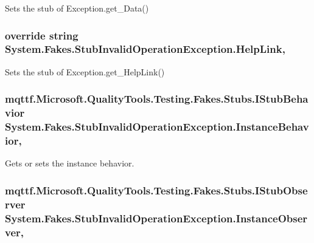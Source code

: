 Sets the stub of Exception.\-get\-\_\-\-Data()

\hypertarget{class_system_1_1_fakes_1_1_stub_invalid_operation_exception_a174fc9ff9bfcf7419921f3185662b211}{
\subsubsection[{Help\-Link}]{\setlength{\rightskip}{0pt plus 5cm}override string System.\-Fakes.\-Stub\-Invalid\-Operation\-Exception.\-Help\-Link\hspace{0.3cm}{\ttfamily [get]}, {\ttfamily [set]}}}\label{class_system_1_1_fakes_1_1_stub_invalid_operation_exception_a174fc9ff9bfcf7419921f3185662b211}


Sets the stub of Exception.\-get\-\_\-\-Help\-Link()

\hypertarget{class_system_1_1_fakes_1_1_stub_invalid_operation_exception_a99a678632f674e88b67d13edc509c18a}{
\subsubsection[{Instance\-Behavior}]{\setlength{\rightskip}{0pt plus 5cm}mqttf.\-Microsoft.\-Quality\-Tools.\-Testing.\-Fakes.\-Stubs.\-I\-Stub\-Behavior System.\-Fakes.\-Stub\-Invalid\-Operation\-Exception.\-Instance\-Behavior\hspace{0.3cm}{\ttfamily [get]}, {\ttfamily [set]}}}\label{class_system_1_1_fakes_1_1_stub_invalid_operation_exception_a99a678632f674e88b67d13edc509c18a}


Gets or sets the instance behavior.

\hypertarget{class_system_1_1_fakes_1_1_stub_invalid_operation_exception_a80b2949c222b8df0f4cd7d496c859682}{
\subsubsection[{Instance\-Observer}]{\setlength{\rightskip}{0pt plus 5cm}mqttf.\-Microsoft.\-Quality\-Tools.\-Testing.\-Fakes.\-Stubs.\-I\-Stub\-Observer System.\-Fakes.\-Stub\-Invalid\-Operation\-Exception.\-Instance\-Observer\hspace{0.3cm}{\ttfamily [get]}, {\ttfamily [set]}}}\label{class_system_1_1_fakes_1_1_stub_invalid_operation_exception_a80b2949c222b8df0f4cd7d496c859682}


